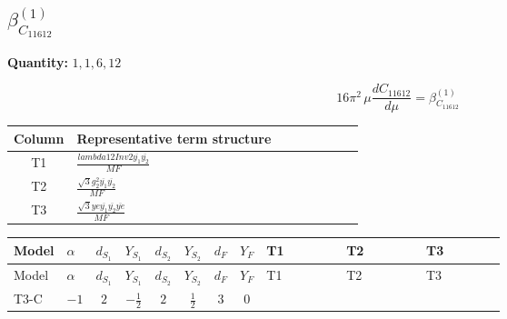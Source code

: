 \documentclass[8pt]{article}
\begin{document}
\begin{landscape}
\section*{$\beta_{C_{11612}}^{(1)}$}
\noindent\textbf{Quantity: }$\mathrm{1,1,6,12}$\par\smallskip
\[16\pi^2\,\mu\frac{d C_{11612}}{d\mu}=\beta_{C_{11612}}^{(1)}\]
\begin{center}
\begin{tabular}{@{}c >{\raggedright\arraybackslash}p{0.82\linewidth}@{}}
\toprule
Column & Representative term structure \\
\midrule
T1 & \(\displaystyle \frac{lambda12Inv2 \overline{y_{1}} \overline{y_{2}}}{MF}\) \\
\midrule
T2 & \(\displaystyle \frac{\sqrt{3} g_{2}^{2} \overline{y_{1}} \overline{y_{2}}}{MF}\) \\
\midrule
T3 & \(\displaystyle \frac{\sqrt{3} ye \overline{y_{1}} \overline{y_{2}} \overline{ye}}{MF}\) \\
\midrule
\bottomrule
\end{tabular}
\end{center}
\smallskip
\tiny
\begin{longtable}{@{}llcccccc >{\raggedright\arraybackslash}p{0.21\linewidth} >{\raggedright\arraybackslash}p{0.21\linewidth} >{\raggedright\arraybackslash}p{0.21\linewidth}@{}}
\toprule
Model & $\alpha$ & $d_{S_1}$ & $Y_{S_1}$ & $d_{S_2}$ & $Y_{S_2}$ & $d_F$ & $Y_F$ & T1 & T2 & T3 \\
\midrule
\endfirsthead
\toprule
Model & $\alpha$ & $d_{S_1}$ & $Y_{S_1}$ & $d_{S_2}$ & $Y_{S_2}$ & $d_F$ & $Y_F$ & T1 & T2 & T3 \\
\midrule
\endhead
T3-C & $-1$ & $2$ & $-\frac{1}{2}$ & $2$ & $\frac{1}{2}$ & $3$ & $0$ & \scriptsize\adjustbox{max width=\linewidth}{$\begin{gathered} \frac{lambda12Inv2 \overline{y_{1}} \overline{y_{2}}}{3 MF}\end{gathered}$} & \scriptsize\adjustbox{max width=\linewidth}{$\begin{gathered} \frac{\sqrt{3} g_{2}^{2} \overline{y_{1}} \overline{y_{2}}}{4 MF}\end{gathered}$} & \scriptsize\adjustbox{max width=\linewidth}{$\begin{gathered} - \frac{\sqrt{3} ye \overline{y_{1}} \overline{y_{2}} \overline{ye}}{12 MF}\end{gathered}$} \\
\midrule
\bottomrule
\end{longtable}
\clearpage

\end{landscape}
\end{document}
